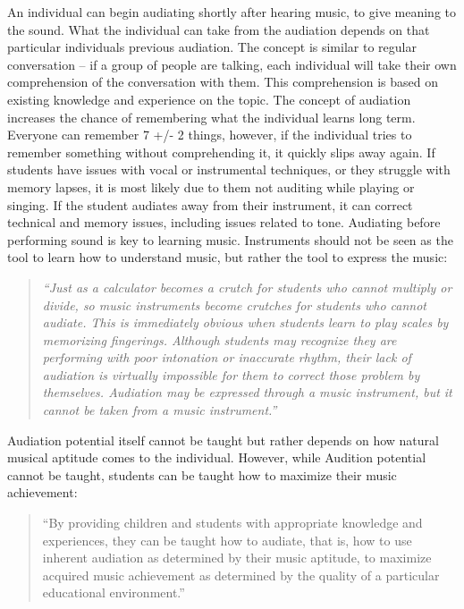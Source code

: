 An individual can begin audiating shortly after hearing music, to give meaning to the sound. What the individual can take from the audiation depends on that particular individuals previous audiation.\cite{audiation} The concept is similar to regular conversation – if a group of people are talking, each individual will take their own comprehension of the conversation with them. This comprehension is based on existing knowledge and experience on the topic.\cite{audiation} 
The concept of audiation increases the chance of remembering what the individual learns long term. Everyone can remember 7 +/- 2 things, however, if the individual tries to remember something without comprehending it, it quickly slips away again. If students have issues with vocal or instrumental techniques, or they struggle with memory lapses, it is most likely due to them not auditing while playing or singing. If the student audiates away from their instrument, it can correct technical and memory issues, including issues related to tone. Audiating before performing sound is key to learning music. Instruments should not be seen as the tool to learn how to understand music, but rather the tool to express the music\cite{audiation}:\\

\begin{quote}
	\textit{“Just as a calculator becomes a crutch for students who cannot multiply or divide, so music instruments become crutches for students who cannot audiate. This is immediately obvious when students learn to play scales by memorizing fingerings. Although students may recognize they are performing with poor intonation or inaccurate rhythm, their lack of audiation is virtually impossible for them to correct those problem by themselves. Audiation may be expressed through a music instrument, but it cannot be taken from a music instrument.”} \cite{audiation} \\
\end{quote} 

Audiation potential itself cannot be taught but rather depends on how natural musical aptitude comes to the individual. However, while Audition potential cannot be taught, students can be taught how to maximize their music achievement\cite{audiation}:\\

\begin{quote}
	“By providing children and students with appropriate knowledge and experiences, they can be taught how to audiate, that is, how to use inherent audiation as determined by their music aptitude, to maximize acquired music achievement as determined by the quality of a particular educational environment.”\cite{audiation}\\
\end{quote}

